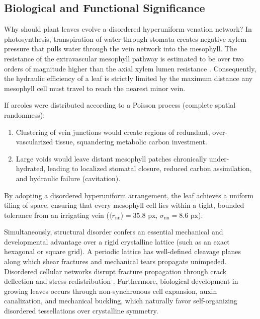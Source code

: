 \documentclass[10pt,twocolumn]{article}
\begin{document}
\subsection{Biological and Functional Significance}
Why should plant leaves evolve a disordered hyperuniform venation network? In photosynthesis, transpiration of water through stomata creates negative xylem pressure that pulls water through the vein network into the mesophyll. The resistance of the extravascular mesophyll pathway is estimated to be over two orders of magnitude higher than the axial xylem lumen resistance \cite{sack2013leaf}. Consequently, the hydraulic efficiency of a leaf is strictly limited by the maximum distance any mesophyll cell must travel to reach the nearest minor vein.

If areoles were distributed according to a Poisson process (complete spatial randomness):
\begin{enumerate}
    \item Clustering of vein junctions would create regions of redundant, over-vascularized tissue, squandering metabolic carbon investment.
    \item Large voids would leave distant mesophyll patches chronically under-hydrated, leading to localized stomatal closure, reduced carbon assimilation, and hydraulic failure (cavitation).
\end{enumerate}
By adopting a disordered hyperuniform arrangement, the leaf achieves a uniform tiling of space, ensuring that every mesophyll cell lies within a tight, bounded tolerance from an irrigating vein ($\langle r_{\mathrm{nn}} \rangle = 35.8\text{ px}$, $\sigma_{\mathrm{nn}} = 8.6\text{ px}$).

Simultaneously, structural disorder confers an essential mechanical and developmental advantage over a rigid crystalline lattice (such as an exact hexagonal or square grid). A periodic lattice has well-defined cleavage planes along which shear fractures and mechanical tears propagate unimpeded. Disordered cellular networks disrupt fracture propagation through crack deflection and stress redistribution \cite{katifori2010damage, moulia2006biomechanics}. Furthermore, biological development in growing leaves occurs through non-synchronous cell expansion, auxin canalization, and mechanical buckling, which naturally favor self-organizing disordered tessellations over crystalline symmetry.
\end{document}
